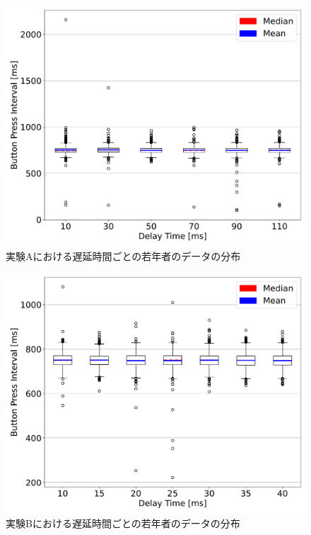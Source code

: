 \begin{figure}[tbp]
  \centering
  \includegraphics[scale=0.4]{figures/Honbann/BOXPLOT/young_110_boxplot.pdf}
  \caption{実験Aにおける遅延時間ごとの若年者のデータの分布}
  \label{fig:110ms_Distribution_of_observations}
\end{figure}
\begin{figure}[tbp]
  \centering
  \includegraphics[scale=0.4]{figures/Honbann/BOXPLOT/young_40_boxplot.pdf}
  \caption{実験Bにおける遅延時間ごとの若年者のデータの分布}
  \label{fig:40ms_Distribution_of_observations}
\end{figure}
